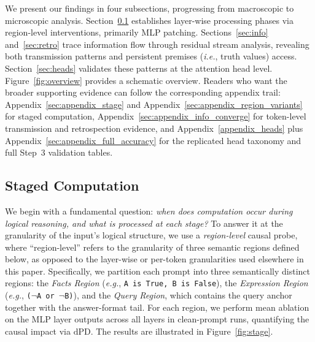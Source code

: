 \documentclass[11pt]{article}
\begin{document}

We present our findings in four subsections, progressing from macroscopic to microscopic analysis. Section~\ref{sec:staged} establishes layer-wise processing phases via region-level interventions, primarily MLP patching. Sections~\ref{sec:info} and~\ref{sec:retro} trace information flow through residual stream analysis, revealing both transmission patterns and persistent premises (\textit{i.e.}, truth values) access. Section~\ref{sec:heads} validates these patterns at the attention head level. Figure~\ref{fig:overview} provides a schematic overview. Readers who want the broader supporting evidence can follow the corresponding appendix trail: Appendix~\ref{sec:appendix_stage} and Appendix~\ref{sec:appendix_region_variants} for staged computation, Appendix~\ref{sec:appendix_info_converge} for token-level transmission and retrospection evidence, and Appendix~\ref{appendix_heads} plus Appendix~\ref{sec:appendix_full_accuracy} for the replicated head taxonomy and full Step~3 validation tables.

\subsection{Staged Computation}
\label{sec:staged}

We begin with a fundamental question: \textit{when does computation occur
during logical reasoning, and what is processed at each stage?}
To answer it at the granularity of the input's logical structure, we use a \emph{region-level} causal probe, where ``region-level'' refers to the granularity of three semantic regions defined below, as opposed to the layer-wise or per-token granularities used elsewhere in this paper. Specifically, we partition each prompt into three semantically distinct regions: the \textit{Facts Region} (\textit{e.g.}, \texttt{A is True, B is False}), the \textit{Expression Region} (\textit{e.g.}, \texttt{($\neg$A or $\neg$B)}), and the \textit{Query Region}, which contains the query anchor together with the answer-format tail. For each region, we perform mean ablation on the MLP layer outputs across all layers in clean-prompt runs, quantifying the causal impact via 
$\text{dPD}$.  
The results are illustrated in Figure~\ref{fig:stage}.
\end{document}
